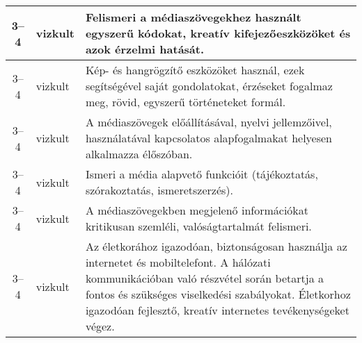 \begin{small}
\begin{longtable}{c | p{2cm} |  p{11cm} }
              3--4 & vizkult & Felismeri a médiaszövegekhez használt egyszerű kódokat, kreatív kifejezőeszközöket és azok érzelmi hatását. \\ \hline
              3--4 & vizkult & Kép- és hangrögzítő eszközöket használ, ezek segítségével saját gondolatokat, érzéseket fogalmaz meg, rövid, egyszerű történeteket formál. \\ \hline
              3--4 & vizkult & A médiaszövegek előállításával, nyelvi jellemzőivel, használatával kapcsolatos alapfogalmakat  helyesen alkalmazza élőszóban. \\ \hline
              3--4 & vizkult & Ismeri a média alapvető funkcióit (tájékoztatás, szórakoztatás, ismeretszerzés). \\ \hline
              3--4 & vizkult & A médiaszövegekben megjelenő információkat kritikusan szemléli,  valóságtartalmát felismeri. \\ \hline
              3--4 & vizkult & Az életkorához igazodóan,  biztonságosan használja az internetet és mobiltelefont.  A hálózati kommunikációban való részvétel során betartja a fontos és szükséges viselkedési szabályokat. Életkorhoz igazodóan fejlesztő, kreatív internetes tevékenységeket végez. \\ \hline
      \end{longtable}
\end{small}


